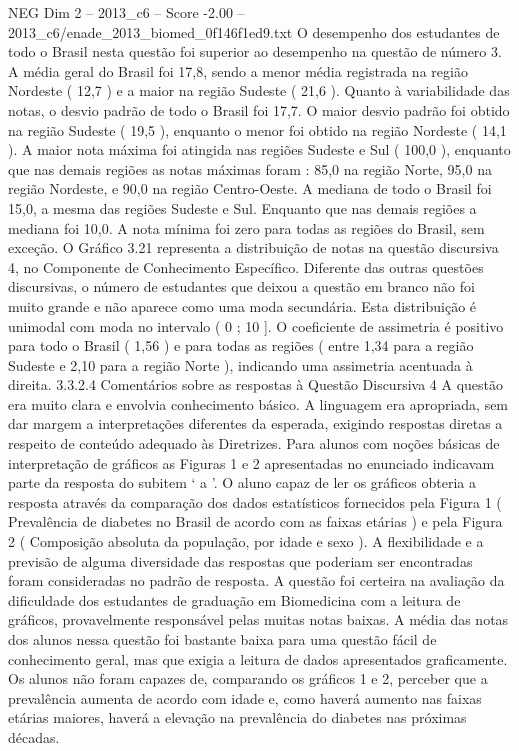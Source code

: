 \begin{textsample}{NEG Dim 2 – 2013\_c6 – Score -2.00 – 2013\_c6/enade\_2013\_biomed\_0f146f1ed9.txt}
O desempenho dos estudantes de todo o Brasil nesta questão foi superior ao desempenho na questão de número 3.
A média geral do Brasil foi 17,8, sendo a menor média registrada na região Nordeste ( 12,7 ) e a maior na região Sudeste ( 21,6 ).
Quanto à variabilidade das notas, o desvio padrão de todo o Brasil foi 17,7.
O maior desvio padrão foi obtido na região Sudeste ( 19,5 ), enquanto o menor foi obtido na região Nordeste ( 14,1 ).
A maior nota máxima foi atingida nas regiões Sudeste e Sul ( 100,0 ), enquanto que nas demais regiões as notas máximas foram : 85,0 na região Norte, 95,0 na região Nordeste, e 90,0 na região Centro-Oeste.
A mediana de todo o Brasil foi 15,0, a mesma das regiões Sudeste e Sul.
Enquanto que nas demais regiões a mediana foi 10,0.
A nota mínima foi zero para todas as regiões do Brasil, sem exceção.
O Gráfico 3.21 representa a distribuição de notas na questão discursiva 4, no Componente de Conhecimento Específico.
Diferente das outras questões discursivas, o número de estudantes que deixou a questão em branco não foi muito grande e não aparece como uma moda secundária.
Esta distribuição é unimodal com moda no intervalo ( 0 ; 10 ].
O coeficiente de assimetria é positivo para todo o Brasil ( 1,56 ) e para todas as regiões ( entre 1,34 para a região Sudeste e 2,10 para a região Norte ), indicando uma assimetria acentuada à direita. 3.3.2.4 Comentários sobre as respostas à Questão Discursiva 4 A questão era muito clara e envolvia conhecimento básico.
A linguagem era apropriada, sem dar margem a interpretações diferentes da esperada, exigindo respostas diretas a respeito de conteúdo adequado às Diretrizes.
Para alunos com noções básicas de interpretação de gráficos as Figuras 1 e 2 apresentadas no enunciado indicavam parte da resposta do subitem ‘ a ’.
O aluno capaz de ler os gráficos obteria a resposta através da comparação dos dados estatísticos fornecidos pela Figura 1 ( Prevalência de diabetes no Brasil de acordo com as faixas etárias ) e pela Figura 2 ( Composição absoluta da população, por idade e sexo ).
A flexibilidade e a previsão de alguma diversidade das respostas que poderiam ser encontradas foram consideradas no padrão de resposta.
A questão foi certeira na avaliação da dificuldade dos estudantes de graduação em Biomedicina com a leitura de gráficos, provavelmente responsável pelas muitas notas baixas.
A média das notas dos alunos nessa questão foi bastante baixa para uma questão fácil de conhecimento geral, mas que exigia a leitura de dados apresentados graficamente.
Os alunos não foram capazes de, comparando os gráficos 1 e 2, perceber que a prevalência aumenta de acordo com idade e, como haverá aumento nas faixas etárias maiores, haverá a elevação na prevalência do diabetes nas próximas décadas.

\end{textsample}
